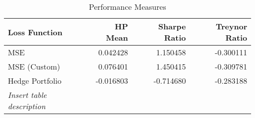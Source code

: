 \begin{table}[H]
     \centering
     \begin{tabular}{lrrr}
          \toprule
          Loss Function   & HP Mean   & Sharpe Ratio & Treynor Ratio \\
          \midrule
          MSE             & 0.042428  & 1.150458     & -0.300111     \\
          MSE (Custom)    & 0.076401  & 1.450415     & -0.309781     \\
          Hedge Portfolio & -0.016803 & -0.714680    & -0.283188     \\[1ex]
          \bottomrule
          \textit{Insert table description}                          \\
     \end{tabular}
     \caption{Performance Measures}
     \label{performance-metrics}
\end{table}